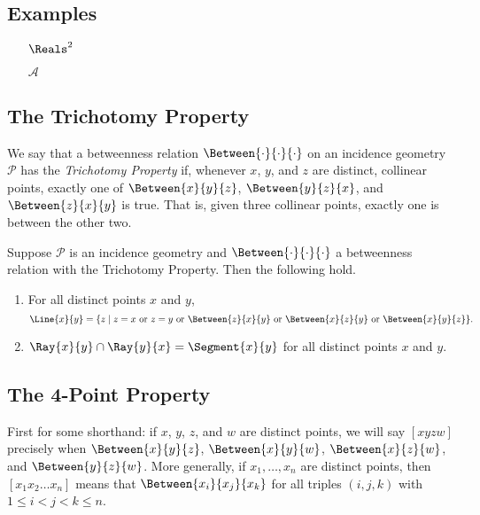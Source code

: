 \documentclass{article}
\begin{document}
\subsection*{Examples}

\begin{itemize}
\item[$\Reals^2$]

\item[$\mathcal{A}$] 
\end{itemize}



\subsection*{The Trichotomy Property}

\begin{dfn}
We say that a betweenness relation $\Between{\cdot}{\cdot}{\cdot}$ on an incidence geometry $\mathcal{P}$ has the \emph{Trichotomy Property} if, whenever $x$, $y$, and $z$ are distinct, collinear points, exactly one of $\Between{x}{y}{z}$, $\Between{y}{z}{x}$, and $\Between{z}{x}{y}$ is true. That is, given three collinear points, exactly one is between the other two.
\end{dfn}

\begin{prop}
Suppose $\mathcal{P}$ is an incidence geometry and $\Between{\cdot}{\cdot}{\cdot}$ a betweenness relation with the Trichotomy Property. Then the following hold.
\begin{enumerate}
\item For all distinct points $x$ and $y$, \[ \Line{x}{y} = \{ z \mid z = x\ \mathrm{or}\ z = y\ \mathrm{or}\ \Between{z}{x}{y}\ \mathrm{or}\ \Between{x}{z}{y}\ \mathrm{or}\ \Between{x}{y}{z} \}. \]
\item $\Ray{x}{y} \cap \Ray{y}{x} = \Segment{x}{y}$ for all distinct points $x$ and $y$.
\end{enumerate}
\end{prop}



\subsection*{The 4-Point Property}

First for some shorthand: if $x$, $y$, $z$, and $w$ are distinct points, we will say $[xyzw]$ precisely when $\Between{x}{y}{z}$, $\Between{x}{y}{w}$, $\Between{x}{z}{w}$, and $\Between{y}{z}{w}$. More generally, if $x_1, \ldots, x_n$ are distinct points, then $[x_1x_2 \ldots x_n]$ means that $\Between{x_i}{x_j}{x_k}$ for all triples $(i,j,k)$ with $1 \leq i < j < k \leq n$.
\end{document}
